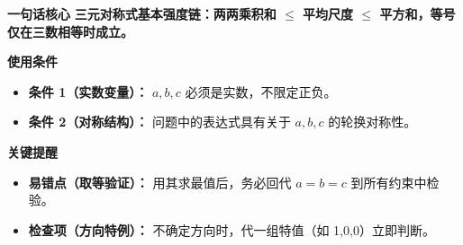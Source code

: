 \begin{summarybox}
\textbf{\textcolor{CSummary}{一句话核心}}
\textbf{三元对称式基本强度链：两两乘积和 $\le$ 平均尺度 $\le$ 平方和，等号仅在三数相等时成立。}

\medskip
\textbf{\textcolor{CSummary}{使用条件}}
\begin{itemize}[leftmargin=*, itemsep=0.5em, topsep=0.4em]
    \item \textbf{条件 1（实数变量）：} $a, b, c$ 必须是实数，不限定正负。
    \item \textbf{条件 2（对称结构）：} 问题中的表达式具有关于 $a, b, c$ 的轮换对称性。
\end{itemize}

\medskip
\textbf{\textcolor{CSummary}{关键提醒}}
\begin{itemize}[leftmargin=*, itemsep=0.5em, topsep=0.4em]
    \item \textbf{易错点（取等验证）：} 用其求最值后，务必回代 $a=b=c$ 到所有约束中检验。
    \item \textbf{检查项（方向特例）：} 不确定方向时，代一组特值（如 1,0,0）立即判断。
\end{itemize}
\end{summarybox}

